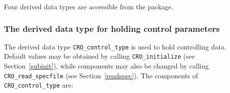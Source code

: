 \documentclass{galahad}
\newcommand{\packagename}{CRO}
\begin{document}







\galtypes
Four derived data types are accessible from the package.


\subsubsection{The derived data type for holding control
 parameters}\label{typecontrol}
The derived data type
{\tt \packagename\_control\_type}
is used to hold controlling data. Default values may be obtained by calling
{\tt \packagename\_initialize}
(see Section~\ref{subinit}),
while components may also be changed by calling
{\tt \packagename\_read\-\_specfile}
(see Section~\ref{readspec}).
The components of
{\tt \packagename\_control\_type}
are:
\end{document}
